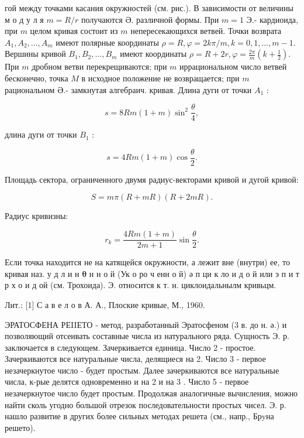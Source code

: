 \documentclass[10pt]{article}
\begin{document}
гой между точками касания окружностей (см. рис.). В зависимости от величины м о д у л я $m=R / r$ получаются Ә. различной формы. При $m=1$ Э.- кардиоида, при $m$ целом кривая состоит из $m$ непересекающихся ветвей. Точки возврата $A_{1}, A_{2}, \ldots, A_{m}$ имеют полярные координаты $\rho=R, \varphi=2 k \pi / m, k=0,1, \ldots, m-1$. Вершины кривой $B_{1}, B_{2}, \ldots, B_{m}$ имеют координаты $\rho=R+2 r, \varphi=\frac{2 \pi}{m}\left(k+\frac{1}{2}\right)$. При $m$ дробном ветви перекрещиваются; при $m$ иррациональном число ветвей бесконечно, точка $M$ в исходное положение не возвращается; при $m$ рациональном Ә.- замкнутая алгебраич. кривая. Длина дуги от точки $A_{1}$ :



\[

s=8 R m(1+m) \sin ^{2} \frac{\theta}{4},

\]



длина дуги от точки $B_{1}$ :



\[

s=4 R m(1+m) \cos \frac{\theta}{2} .

\]



Площадь сектора, ограниченного двумя радиус-векторами кривой и дугой кривой:



\[

S=m \pi(R+m R)(R+2 m R) .

\]



Радиус кривизны:



\[

r_{k}=\frac{4 R m(1+m)}{2 m+1} \sin \frac{\theta}{2} .

\]



Если точка находится не на катящейся окружности, а лежит вне (внутри) ее, то кривая наз. у д л и н $\boldsymbol{\theta}$ н н о й (Ук о ро ч енн о й) ә п ци к ло и д о й или э п и т р х о и д ой (см. Трохоида). Э. относится к т. н. циклоидальнылм кривьцм.



Лит.: [1] С а в е л о в А. А., Плоские кривые, М., 1960.



ЭРАТОСФЕНА РЕIIЕТО - метод, разработанный Эратосфеном (3 в. до н. ә.) и позволяющий отсеивать составные числа из натурального ряда. Сущность Э. р. заключается в следующем. Зачеркивается единица. Число 2 - простое. Зачеркиваются все натуральные числа, делящиеся на 2. Число 3 - первое незачеркнутое число - будет простым. Далее зачеркиваются все натуральные числа, к-рые делятся одновременно и на 2 и на 3 . Число 5 - первое незачеркнутое число будет простым. Продолжая аналогичные вычисления, можно найти сколь угодно большой отрезок последовательности простых чисел. Э. р. нашло развитие в других более сильных методах решета (см., напр., Брyна решето).
\end{document}
